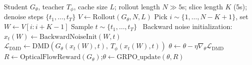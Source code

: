 \begin{algorithm}[H]
  \caption{Self-Forcing++ with Backward Noise Initialization (ours)}
  \small
  \begin{algorithmic}[1]
    \Require Student \(G_{\theta}\), teacher \(T_{\phi}\), cache size \(L\); 
             rollout length \(N \gg 5\)s; slice length \(K\) (5s);
             denoise steps \(\{t_1,\dots,t_T\}\)
    \Loop
      \State \(V \gets \mathrm{Rollout}(G_{\theta}, N, L)\)  
      \State Pick \(i \sim \{1,\dots,N{-}K{+}1\}\), set \(W \gets V[i:i{+}K{-}1]\) 
      \State Sample \(t \sim \{t_1,\dots,t_T\}\) \
      \State Backward noise initialization: 
             \(x_t(W) \gets \text{BackwardNoiseInit}(W, t)\) 
      \State \(\mathcal{L}_{\mathrm{DMD}} \gets 
             \mathrm{DMD}(G_{\theta}(x_t(W), t),~T_{\phi}(x_t(W), t))\)
      \State \(\theta \gets \theta - \eta \nabla_{\theta}\mathcal{L}_{\mathrm{DMD}}\)
    \EndLoop
    \State $R \gets \mathrm{OpticalFlowReward}(G_\theta)$;\quad $\theta \gets \mathrm{GRPO\_update}(\theta, R)$ 
  \end{algorithmic}
    \label{alg:alg1}
\end{algorithm}
